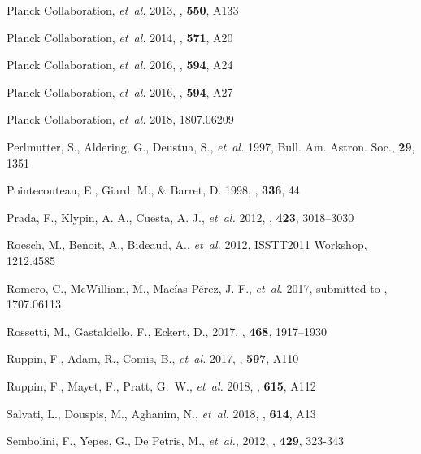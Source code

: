 \documentclass[twocolumn,traditabstract]{aa}
\begin{document}
\begin{thebibliography}{81}
{Planck Collaboration}, \emph{et~al.} 2013, \aap, \textbf{550}, A133

{Planck Collaboration}, \emph{et~al.} 2014, \aap, \textbf{571}, A20

{Planck Collaboration}, \emph{et~al.} 2016{}, \aap, \textbf{594}, A24

{Planck Collaboration}, \emph{et~al.} 2016{}, \aap, \textbf{594}, A27

{Planck Collaboration}, \emph{et~al.} 2018, 1807.06209

Perlmutter, S., Aldering, G., Deustua, S., \emph{et~al.} 1997, Bull. Am. Astron. Soc., \textbf{29}, 1351

Pointecouteau, E., Giard, M., \& Barret, D. 1998, \aap, \textbf{336}, 44

{Prada}, F., Klypin, A. A., Cuesta, A. J., \emph{et~al.} 2012, \mnras, \textbf{423}, 3018–3030

Roesch, M., Benoit, A., Bideaud, A., \emph{et~al.} 2012, ISSTT2011 Workshop, 1212.4585

Romero, C., McWilliam, M., Mac\'ias-P\'erez, J. F., \emph{et~al.} 2017, submitted to \aap, 1707.06113

Rossetti, M., Gastaldello, F., Eckert, D., 2017, \mnras, \textbf{468}, 1917–1930
  
Ruppin, F., Adam, R., Comis, B., \emph{et~al.} 2017, \aap, \textbf{597}, A110

Ruppin, F., Mayet, F., Pratt, G.~W., \emph{et~al.} 2018, \aap, \textbf{615}, A112

{Salvati}, L., {Douspis}, M., {Aghanim}, N., \emph{et~al.} 2018, \aap, \textbf{614}, A13

Sembolini, F., Yepes, G., De Petris, M., \emph{et~al.}, 2012, \mnras, \textbf{429}, 323-343


\end{thebibliography}
\end{document}
